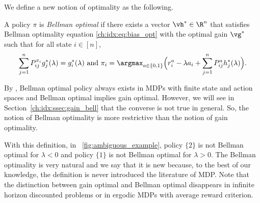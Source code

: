 


We define a new notion of optimality as the following.
\begin{defn}
    \label{ch:idx:defn:bell}
    A policy $\pi$ is \emph{Bellman optimal} if there exists a vector $\vh^*\in\R^n$ that satisfies Bellman optimality equation \eqref{ch:idx:eq:bias_opt} with the optimal gain $\vg^*$ such that for all state $i\in[n]$,
    \begin{equation}
        \label{ch:idx:eq:bell}
        \sum_{j=1}^nP^{\pi_i}_{ij}g^*_j(\lambda)=g^*_i(\lambda) \text{ and } \pi_i=\argmax_{a\in\{0,1\}} \Big(r^{a}_i - \lambda a_i + \sum_{j=1}^n P^{a}_{ij}h^*_j(\lambda)\Big).
    \end{equation}
\end{defn}
By \cite[Theorem~9.1.7]{puterman2014markov}, Bellman optimal policy always exists in MDPs with finite state and action spaces and Bellman optimal implies gain optimal.
However, we will see in Section~\ref{ch:idx:ssec:gain_bell} that the converse is not true in general.
So, the notion of Bellman optimality is more restrictive than the notion of gain optimality.

With this definition, in \figurename~\ref{fig:ambiguous_example}, policy $\{2\}$ is not Bellman optimal for $\lambda<0$ and policy $\{1\}$ is not Bellman optimal for $\lambda>0$.
The Bellman optimality is very natural and we say that it is new because, to the best of our knowledge, the definition is never introduced the literature of MDP.
Note that the distinction between gain optimal and Bellman optimal disappears in infinite horizon discounted problems or in ergodic MDPs with average reward criterion.


